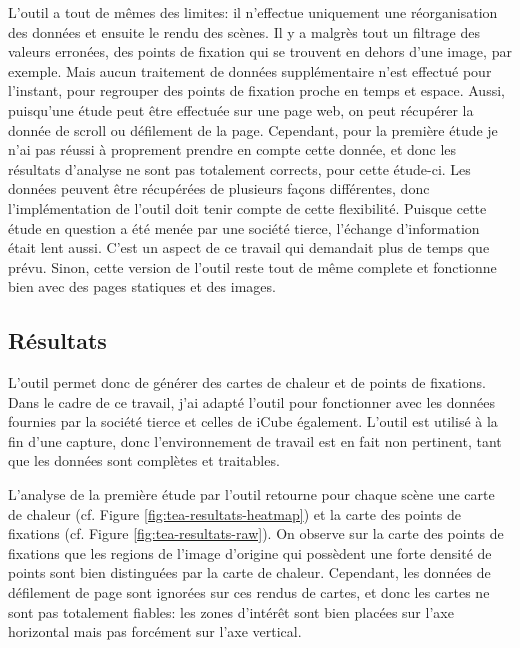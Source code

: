 \documentclass[hidelinks,12pt]{article}
\begin{document}
\bigskip
L'outil a tout de mêmes des limites: il n'effectue uniquement une
réorganisation des données et ensuite le rendu des scènes. Il y a malgrès tout
un filtrage  des valeurs erronées, des points de fixation qui se trouvent en
dehors d'une image, par exemple. Mais aucun traitement de données
supplémentaire n'est effectué pour l'instant, pour regrouper des points de
fixation proche en temps et espace. Aussi, puisqu'une étude peut
être effectuée sur une page web, on peut récupérer la donnée de scroll ou
défilement de la page. Cependant, pour la première étude je n'ai pas réussi à
proprement prendre en compte cette donnée, et donc les résultats d'analyse ne
sont pas totalement corrects, pour cette étude-ci. Les données peuvent être
récupérées de plusieurs façons différentes, donc l'implémentation de l'outil
doit tenir compte de cette flexibilité. Puisque cette étude en question a été
menée par une société tierce, l'échange d'information était lent aussi. C'est
un aspect de ce travail qui demandait plus de temps que prévu. Sinon, cette
version de l'outil reste tout de même complete et fonctionne bien avec des
pages statiques et des images.

\subsection{Résultats}

L'outil permet donc de générer des cartes de chaleur et de points de fixations.
Dans le cadre de ce travail, j'ai adapté l'outil pour fonctionner avec les
données fournies par la société tierce et celles de iCube également. L'outil est
utilisé à la fin d'une capture, donc l'environnement de travail est en fait non
pertinent, tant que les données sont complètes et traitables.

\bigskip
L'analyse de la première étude par l'outil retourne pour chaque scène une carte
de chaleur (cf. Figure \ref{fig:tea-resultats-heatmap}) et la carte des points
de fixations (cf. Figure \ref{fig:tea-resultats-raw}). On observe sur la carte
des points de fixations que les regions de l'image d'origine qui possèdent une
forte densité de points sont bien distinguées par la carte de chaleur.
Cependant, les données de défilement de page sont ignorées sur ces rendus de
cartes, et donc les cartes ne sont pas totalement fiables: les zones
d'intérêt sont bien placées sur l'axe horizontal mais pas forcément sur l'axe
vertical.
\end{document}
